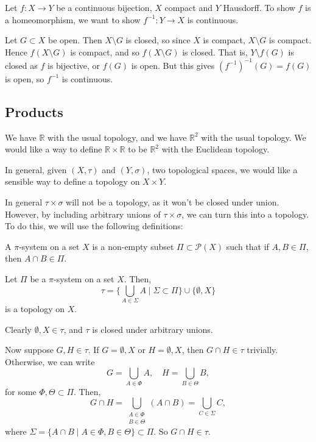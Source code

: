 \documentclass[12pt]{article}
\begin{document}
\begin{proofbox}
	Let $f : X \to Y$ be a continuous bijection, $X$ compact and $Y$ Hausdorff. To show $f$ is a homeomorphism, we want to show $f^{-1} : Y \to X$ is continuous.

	Let $G \subset X$ be open. Then $X \setminus G$ is closed, so since $X$ is compact, $X \setminus G$ is compact. Hence $f(X \setminus G)$ is compact, and so $f(X \setminus G)$ is closed. That is, $Y \setminus f(G)$ is closed as $f$ is bijective, or $f(G)$ is open. But this gives $(f^{-1})^{-1}(G) = f(G)$ is open, so $f^{-1}$ is continuous.
\end{proofbox}

\subsection{Products}%
\label{sub:products}

We have $\mathbb{R}$ with the usual topology, and we have $\mathbb{R}^2$ with the usual topology. We would like a way to define $\mathbb{R} \times \mathbb{R}$ to be $\mathbb{R}^2$ with the Euclidean topology.

In general, given $(X, \tau)$ and $(Y, \sigma)$, two topological spaces, we would like a sensible way to define a topology on $X \times Y$.

In general $\tau \times \sigma$ will not be a topology, as it won't be closed under union. However, by including arbitrary unions of $\tau \times \sigma$, we can turn this into a topology. To do this, we will use the following definitions:

\begin{definition}
	A $\pi$-system on a set $X$ is a non-empty subset $\Pi \subset \mathcal{P}(X)$ such that if $A, B \in \Pi$, then $A \cap B \in \Pi$.
\end{definition}

\begin{proposition}
	Let $\Pi$ be a $\pi$-system on a set $X$. Then,
	\[
		\tau = \Biggl\{ \bigcup_{A \in \Sigma} A \mid \Sigma \subset \Pi \Biggr\} \cup \{\emptyset, X\}
	\]
	is a topology on $X$.
\end{proposition}

\begin{proofbox}
	Clearly $\emptyset, X \in \tau$, and $\tau$ is closed under arbitrary unions.

	Now suppose $G, H \in \tau$. If $G = \emptyset, X$ or $H = \emptyset, X$, then $G \cap H \in \tau$ trivially. Otherwise, we can write
	\[
	G = \bigcup_{A \in \Phi} A, \quad H = \bigcup_{B \in \Theta}B
	,\]
	for some $\Phi, \Theta \subset \Pi$. Then,
	\[
		G \cap H = \bigcup_{\substack{A \in \Phi \\ B \in \Theta}} (A \cap B) = \bigcup_{C \in \Sigma} C
	,\]
	where $\Sigma = \{A \cap B \mid A \in \Phi, B \in \Theta\} \subset \Pi$. So $G \cap H \in \tau$.
\end{proofbox}
\end{document}
